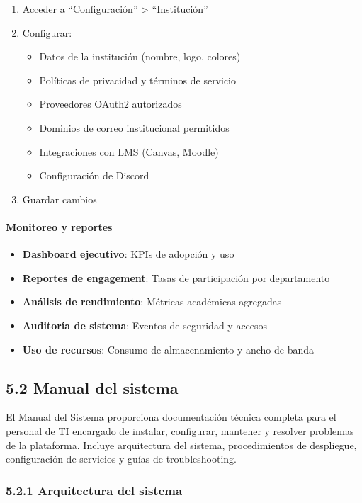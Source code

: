 \begin{enumerate}
	\item Acceder a ``Configuración'' > ``Institución''
	\item Configurar:
	\begin{itemize}
		\item Datos de la institución (nombre, logo, colores)
		\item Políticas de privacidad y términos de servicio
		\item Proveedores OAuth2 autorizados
		\item Dominios de correo institucional permitidos
		\item Integraciones con LMS (Canvas, Moodle)
		\item Configuración de Discord
	\end{itemize}
	\item Guardar cambios
\end{enumerate}

\paragraph{Monitoreo y reportes}

\begin{itemize}
	\item \textbf{Dashboard ejecutivo}: KPIs de adopción y uso
	\item \textbf{Reportes de engagement}: Tasas de participación por departamento
	\item \textbf{Análisis de rendimiento}: Métricas académicas agregadas
	\item \textbf{Auditoría de sistema}: Eventos de seguridad y accesos
	\item \textbf{Uso de recursos}: Consumo de almacenamiento y ancho de banda
\end{itemize}

\subsection{5.2 Manual del sistema}

El Manual del Sistema proporciona documentación técnica completa para el personal de TI encargado de instalar, configurar, mantener y resolver problemas de la plataforma. Incluye arquitectura del sistema, procedimientos de despliegue, configuración de servicios y guías de troubleshooting.

\subsubsection{5.2.1 Arquitectura del sistema}

